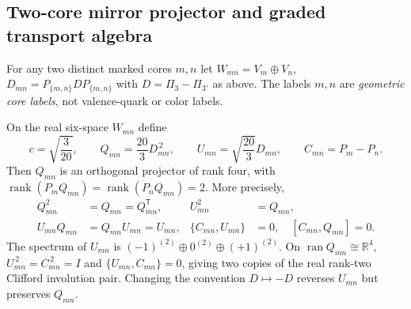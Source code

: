 \documentclass[11pt]{article}
\begin{document}
\subsection{Two-core mirror projector and graded transport algebra}
\label{p1:sec:v327-two-core-mirror-clifford}
For any two distinct marked cores $m,n$ let
$W_{mn}=V_m\oplus V_n$, $D_{mn}=P_{\{m,n\}}DP_{\{m,n\}}$
with $D=\Pi_3-\Pi_{3'}$ as above.  The labels $m,n$ are
\emph{geometric core labels}, not valence-quark or color labels.

\begin{theorem}
\label{p1:thm:v327-pair-mirror-projector}
On the real six-space $W_{mn}$ define
\[
 c=\sqrt{\frac3{20}},\qquad
 Q_{mn}=\frac{20}{3}D_{mn}^{\,2},\qquad
 U_{mn}=\sqrt{\frac{20}{3}}D_{mn},\qquad
 C_{mn}=P_m-P_n.
\]
Then $Q_{mn}$ is an orthogonal projector of rank four, with
$\operatorname{rank}(P_m Q_{mn})=
 \operatorname{rank}(P_n Q_{mn})=2$. More precisely,
\[
\begin{aligned}
 Q_{mn}^2&=Q_{mn}=Q_{mn}^{\mathsf T},&
 U_{mn}^2&=Q_{mn},\\
 U_{mn}Q_{mn}&=Q_{mn}U_{mn}=U_{mn},&
 \{C_{mn},U_{mn}\}&=0,\quad [C_{mn},Q_{mn}]=0.
\end{aligned}
\]
The spectrum of $U_{mn}$ is
$(-1)^{(2)}\oplus0^{(2)}\oplus(+1)^{(2)}$.
On $\operatorname{ran}Q_{mn}\cong\mathbb R^4$,
$U_{mn}^{\,2}=C_{mn}^{\,2}=I$ and
$\{U_{mn},C_{mn}\}=0$, giving two copies of the real
rank-two Clifford involution pair.
Changing the convention $D\mapsto-D$ reverses $U_{mn}$ but preserves
$Q_{mn}$.
\end{theorem}
\end{document}
